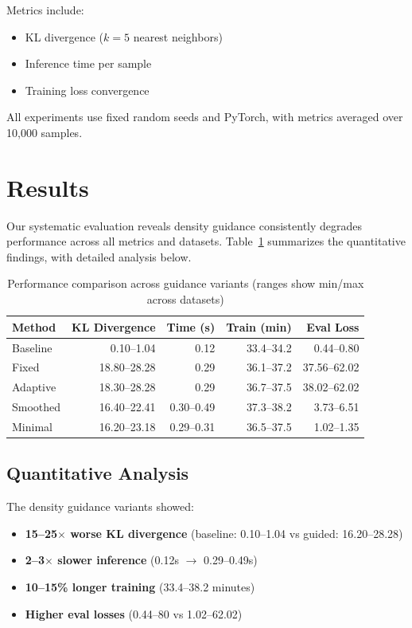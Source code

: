 \documentclass{article} %
\begin{document}
Metrics include:
\begin{itemize}
    \item KL divergence ($k=5$ nearest neighbors)
    \item Inference time per sample
    \item Training loss convergence
\end{itemize}

All experiments use fixed random seeds and PyTorch, with metrics averaged over 10,000 samples.

\section{Results}
\label{sec:results}

Our systematic evaluation reveals density guidance consistently degrades performance across all metrics and datasets. Table~\ref{tab:results} summarizes the quantitative findings, with detailed analysis below.

\begin{table}[t]
\centering
\caption{Performance comparison across guidance variants (ranges show min/max across datasets)}
\label{tab:results}
\begin{tabular}{lrrrr}
\toprule
Method & KL Divergence & Time (s) & Train (min) & Eval Loss \\
\midrule
Baseline & 0.10--1.04 & 0.12 & 33.4--34.2 & 0.44--0.80 \\
Fixed & 18.80--28.28 & 0.29 & 36.1--37.2 & 37.56--62.02 \\
Adaptive & 18.30--28.28 & 0.29 & 36.7--37.5 & 38.02--62.02 \\
Smoothed & 16.40--22.41 & 0.30--0.49 & 37.3--38.2 & 3.73--6.51 \\
Minimal & 16.20--23.18 & 0.29--0.31 & 36.5--37.5 & 1.02--1.35 \\
\bottomrule
\end{tabular}
\end{table}

\subsection{Quantitative Analysis}
The density guidance variants showed:
\begin{itemize}
\item \textbf{15--25$\times$ worse KL divergence} (baseline: 0.10--1.04 vs guided: 16.20--28.28)
\item \textbf{2--3$\times$ slower inference} (0.12s $\rightarrow$ 0.29--0.49s)
\item \textbf{10--15\% longer training} (33.4--38.2 minutes)
\item \textbf{Higher eval losses} (0.44--80 vs 1.02--62.02)
\end{itemize}
\end{document}
